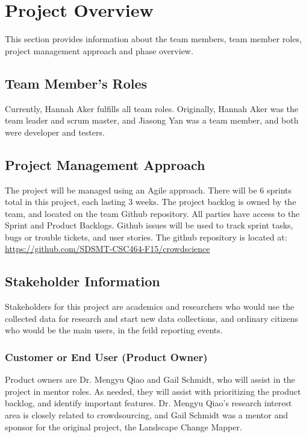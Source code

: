 

\chapter{Project Overview}
This section provides information about the team members, team member roles, project management approach and phase overview.

\section{Team Member's Roles}
Currently, Hannah Aker fulfills all team roles. Originally, Hannah Aker was the team leader and scrum master, and Jiasong Yan was a team member, and both were developer and testers.

\section{Project  Management Approach}
The project will be managed using an Agile approach.  There will be 6 sprints total in this project, each lasting 3 weeks. The project backlog is owned by the team, and located on the team Github repository. All parties have access to the Sprint and Product Backlogs. Github issues will be used to track sprint tasks, bugs or trouble tickets, and user stories. The github repository is located at: \url{https://github.com/SDSMT-CSC464-F15/crowdscience} 


\section{ Stakeholder Information}
Stakeholders for this project are academics and researchers who would use the collected data for research and start new data collections, and ordinary citizens who would be the main users, in the feild reporting events. 


\subsection{Customer or End User (Product Owner)}
Product owners are Dr. Mengyu Qiao and Gail Schmidt, who will assist in the project in mentor roles. As needed, they will assist with prioritizing the product backlog, and identify important features. Dr. Mengyu Qiao's research interest area is closely related to crowdsourcing, and Gail Schmidt was a mentor and sponsor for the original project, the Landscape Change Mapper.

